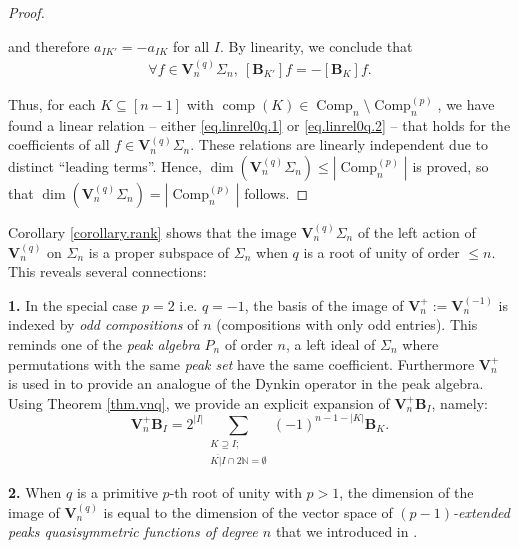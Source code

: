 \documentclass[revision]{FPSAC2025}
\newcommand{\NN}{\mathbb{N}} %
\newcommand{\BB}{\mathbf{B}} %
\newcommand{\QSym}{\operatorname{QSym}}
\newcommand{\comp}{\operatorname{comp}}
\newcommand{\Comp}{\operatorname{Comp}}
\begin{document}
\begin{proof}
\begin{itemize}
and therefore $a_{IK'} = - a_{IK}$ for all $I$. By linearity, we conclude that
\begin{align}
\label{eq.linrel0q.2}
\forall f \in \mathbf{V}_n^{(q)}\Sigma_n, \ [\BB_{K'}]f = -[\BB_K]f.
\end{align}
\end{itemize}
Thus, for each $K \subseteq [n-1]$ with $\comp(K) \in \Comp_n \setminus \Comp_n^{(p)}$, we have found a linear relation -- either \eqref{eq.linrel0q.1} or \eqref{eq.linrel0q.2} -- that holds for the coefficients of all $f \in \mathbf{V}_n^{(q)}\Sigma_n$.
These relations are linearly independent due to distinct ``leading terms''.
Hence, $\dim\left(\mathbf{V}_n^{(q)}\Sigma_n\right) \leq |\Comp_n^{(p)}|$ is proved,
so that $\dim\left(\mathbf{V}_n^{(q)}\Sigma_n\right) = |\Comp_n^{(p)}|$ follows.
\end{proof}

Corollary \ref{corollary.rank} shows that the image $\mathbf{V}^{(q)}_n\Sigma_n$ of the left action of $\mathbf{V}^{(q)}_n$ on $\Sigma_n$ is a proper subspace of $\Sigma_n$ when $q$ is a root of unity of order $\leq n$.
This reveals several connections:

\textbf{1.} In the special case $p=2$ i.e. $q=-1$, the basis of the image of $\mathbf{V}^{+}_n:=\mathbf{V}^{(-1)}_n$ is indexed by \emph{odd compositions} of $n$ (compositions with only odd entries). This reminds one of the \emph{peak algebra} $P_n$ of order $n$, a left ideal of $\Sigma_n$ where permutations with the same \emph{peak set} have the same coefficient. Furthermore $\mathbf{V}^{+}_n$ is used in \cite{Sch05} to provide an analogue of the Dynkin operator in the peak algebra. Using Theorem \ref{thm.vnq}, we provide an explicit expansion of $\mathbf{V}^{+}_n\mathbf{B}_I$, namely:
\begin{equation}
\mathbf{V}^{+}_n\mathbf{B}_I = 2^{|I|}\sum_{\substack{K \supseteq I; \\ \overline{K|I} \cap 2\NN = \emptyset}}(-1)^{n-1-|K|}\mathbf{B}_K.
\end{equation}

\textbf{2.} When $q$ is a primitive $p$-th root of unity with $p>1$, the dimension of the image of $\mathbf{V}^{(q)}_n$ is equal to the dimension of the vector space of \emph{$(p-1)$-extended peaks quasisymmetric functions of degree $n$} that we introduced in \cite{GriVas23}.
\end{document}
